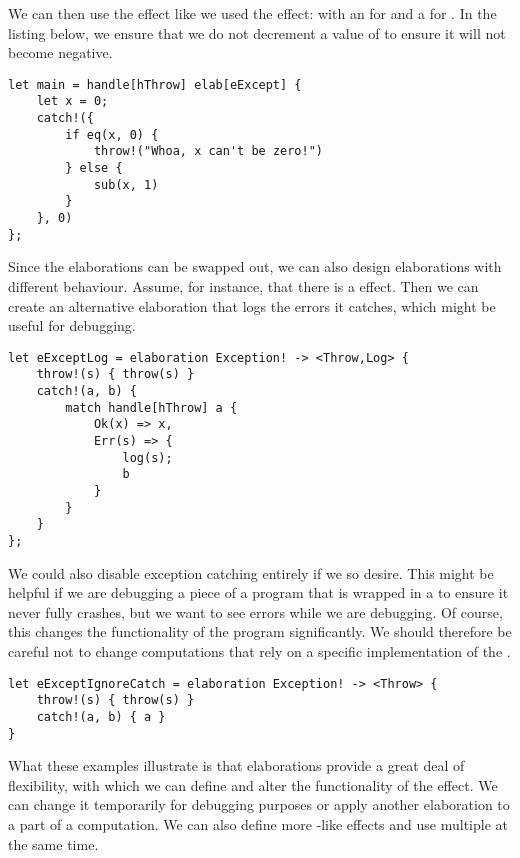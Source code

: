 We can then use the effect like we used the  effect: with an  for  and a  for . In the listing below, we ensure that we do not decrement a value of  to ensure it will not become negative.

\begin{lstlisting}[language=elaine,style=fancy]
let main = handle[hThrow] elab[eExcept] {
    let x = 0;
    catch!({
        if eq(x, 0) {
            throw!("Whoa, x can't be zero!")
        } else {
            sub(x, 1) 
        }
    }, 0)
};
\end{lstlisting}

Since the elaborations can be swapped out, we can also design elaborations with different behaviour. Assume, for instance, that there is a  effect. Then we can create an alternative elaboration that logs the errors it catches, which might be useful for debugging.

\begin{lstlisting}[language=elaine,style=fancy]
let eExceptLog = elaboration Exception! -> <Throw,Log> {
    throw!(s) { throw(s) }
    catch!(a, b) {
        match handle[hThrow] a {
            Ok(x) => x,
            Err(s) => {
                log(s);
                b
            }
        }
    }
};
\end{lstlisting}

We could also disable exception catching entirely if we so desire. This might be helpful if we are debugging a piece of a program that is wrapped in a  to ensure it never fully crashes, but we want to see errors while we are debugging. Of course, this changes the functionality of the program significantly. We should therefore be careful not to change computations that rely on a specific implementation of the .

\begin{lstlisting}[language=elaine,style=fancy]
let eExceptIgnoreCatch = elaboration Exception! -> <Throw> {
    throw!(s) { throw(s) }
    catch!(a, b) { a }
}
\end{lstlisting}

What these examples illustrate is that elaborations provide a great deal of flexibility, with which we can define and alter the functionality of the  effect. We can change it temporarily for debugging purposes or apply another elaboration to a part of a computation. We can also define more -like effects and use multiple at the same time.
